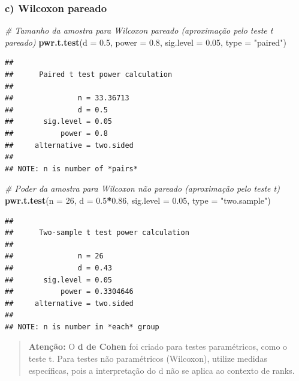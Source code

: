 \documentclass[
]{book}
\newenvironment{Shaded}{\begin{snugshade}}{\end{snugshade}}
\newcommand{\AttributeTok}[1]{\textcolor[rgb]{0.13,0.29,0.53}{#1}}
\newcommand{\CommentTok}[1]{\textcolor[rgb]{0.56,0.35,0.01}{\textit{#1}}}
\newcommand{\DecValTok}[1]{\textcolor[rgb]{0.00,0.00,0.81}{#1}}
\newcommand{\FloatTok}[1]{\textcolor[rgb]{0.00,0.00,0.81}{#1}}
\newcommand{\FunctionTok}[1]{\textcolor[rgb]{0.13,0.29,0.53}{\textbf{#1}}}
\newcommand{\NormalTok}[1]{#1}
\newcommand{\SpecialCharTok}[1]{\textcolor[rgb]{0.81,0.36,0.00}{\textbf{#1}}}
\newcommand{\StringTok}[1]{\textcolor[rgb]{0.31,0.60,0.02}{#1}}
\begin{document}
\subsubsection{c) Wilcoxon pareado}\label{c-wilcoxon-pareado}

\begin{Shaded}
\begin{Highlighting}[]
\CommentTok{\# Tamanho da amostra para Wilcoxon pareado (aproximação pelo teste t pareado)}
\FunctionTok{pwr.t.test}\NormalTok{(}\AttributeTok{d =} \FloatTok{0.5}\NormalTok{, }\AttributeTok{power =} \FloatTok{0.8}\NormalTok{, }\AttributeTok{sig.level =} \FloatTok{0.05}\NormalTok{, }\AttributeTok{type =} \StringTok{"paired"}\NormalTok{)}
\end{Highlighting}
\end{Shaded}

\begin{verbatim}
## 
##      Paired t test power calculation 
## 
##               n = 33.36713
##               d = 0.5
##       sig.level = 0.05
##           power = 0.8
##     alternative = two.sided
## 
## NOTE: n is number of *pairs*
\end{verbatim}

\begin{Shaded}
\begin{Highlighting}[]
\CommentTok{\# Poder da amostra para Wilcoxon não pareado (aproximação pelo teste t)}
\FunctionTok{pwr.t.test}\NormalTok{(}\AttributeTok{n =} \DecValTok{26}\NormalTok{, }\AttributeTok{d =} \FloatTok{0.5}\SpecialCharTok{*}\FloatTok{0.86}\NormalTok{, }\AttributeTok{sig.level =} \FloatTok{0.05}\NormalTok{, }\AttributeTok{type =} \StringTok{"two.sample"}\NormalTok{)}
\end{Highlighting}
\end{Shaded}

\begin{verbatim}
## 
##      Two-sample t test power calculation 
## 
##               n = 26
##               d = 0.43
##       sig.level = 0.05
##           power = 0.3304646
##     alternative = two.sided
## 
## NOTE: n is number in *each* group
\end{verbatim}

\begin{quote}
\textbf{Atenção:} O \textbf{d de Cohen} foi criado para testes paramétricos, como o teste t. Para testes não paramétricos (Wilcoxon), utilize medidas específicas, pois a interpretação do d não se aplica ao contexto de ranks.
\end{quote}
\end{document}
